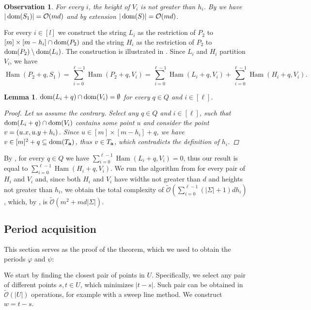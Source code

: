 \documentclass[11pt]{article}
\renewcommand{\O}{\mathcal{O}}
\newcommand{\tO}{\tilde{\mathcal{O}}}
\renewcommand{\phi}{\varphi}
\theoremstyle{plain}
\newtheorem{lemma}{Lemma}
\newtheorem{observation}{Observation}
\theoremstyle{definition}
\theoremstyle{remark}
\DeclareMathOperator*{\Ham}{Ham}
\begin{document}
\begin{observation}\label{area_bound}
	For every $i$, the height of $V_i$ is not greater than $h_i$.
	By  we have $|\d{S_1}| = \O(md)$ and by extension $|\d{S}| = \O(md)$.
\end{observation}

For every $i \in [l]$ we construct the string $L_i$ as the restriction of $P_2$ to $[m] \times [m - h_i] \cap \operatorname*{dom}(P_2)$
and the string $H_i$ as the restriction of $P_2$ to $\operatorname*{dom}(P_2) \setminus \operatorname*{dom}(L_i)$.
The construction is illustrated in .
Since $L_i$ and $H_i$ partition $V_i$, we have
\[ \Ham(P_2 + q, S_1) = \sum_{i = 0}^{\ell - 1} \Ham(P_2 + q, V_i) = \sum_{i = 0}^{\ell - 1} \Ham(L_i + q, V_i) + \sum_{i = 0}^{\ell - 1} \Ham(H_i + q, V_i). \]

\begin{lemma}\label{pattern_height_reduction}
	$\operatorname*{dom}(L_i + q) \cap \operatorname*{dom}(V_i) = \emptyset$ for every $q \in Q$ and $i \in [\ell]$.
	\begin{proof}
		Let us assume the contrary.
		Select any $q \in Q$ and $i \in [\ell]$, such that $\operatorname*{dom}(L_i + q) \cap \operatorname*{dom}(V_i)$ 
		contains some point $u$ and consider the point $v = (u.x, u.y + h_i)$.
		Since $u \in [m] \times [m - h_i] + q$, we have $v \in [m]^2 + q \subseteq \operatorname*{dom}(T_\mathbf{a})$, thus $v \in T_\mathbf{a}$, which contradicts the definition of $h_i$.
	\end{proof}
\end{lemma}

By , for every $q \in Q$ we have $\sum_{i = 0}^{\ell - 1} \Ham(L_i + q, V_i) = 0$, thus our result is equal to $\sum_{i = 0}^{\ell - 1} \Ham(H_i + q, V_i)$.
We run the algorithm from  for every pair of $H_i$ and $V_i$ and, since both $H_i$ and $V_i$ have widths not greater than $d$ and heights not greater than $h_i$, we obtain the total complexity of $\tO(\sum_{i = 0}^{\ell - 1} (|\Sigma| + 1)dh_i)$, 
which, by , is $\tO(m^2 + md|\Sigma|)$.


\subsection{Period acquisition} \label{get_periods_proof}

This section serves as the proof of the theorem, which we used to obtain the periods $\phi$ and $\psi$:

\GetPeriods

We start by finding the closest pair of points in $U$.
Specifically, we select any pair of different points $s, t \in U$, which minimizes $|t - s|$. 
Such pair can be obtained in $\tO(|U|)$ operations, for example with a sweep line method.
We construct $w = t - s$.
\end{document}
